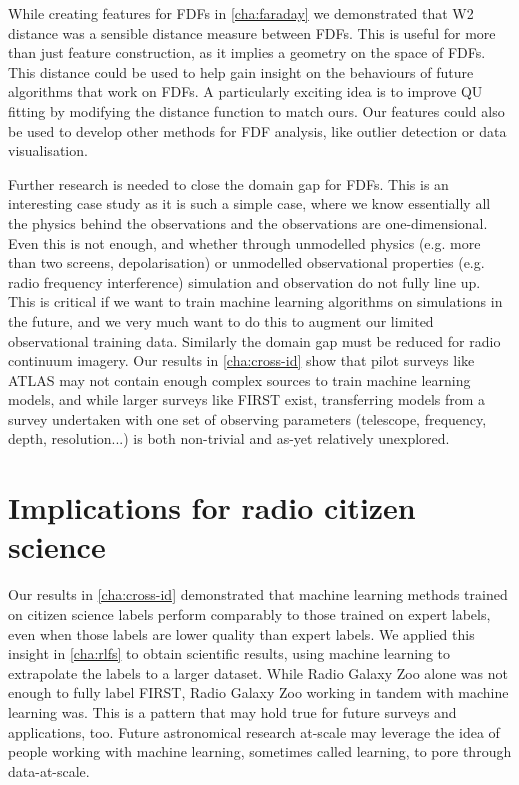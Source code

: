      While creating features for FDFs in \autoref{cha:faraday} we demonstrated that W2 distance was a sensible distance measure between FDFs. This is useful for more than just feature construction, as it implies a geometry on the space of FDFs. This distance could be used to help gain insight on the behaviours of future algorithms that work on FDFs. A particularly exciting idea is to improve QU fitting by modifying the distance function to match ours. Our features could also be used to develop other methods for FDF analysis, like outlier detection or data visualisation.

     Further research is needed to close the domain gap for FDFs. This is an interesting case study as it is such a simple case, where we know essentially all the physics behind the observations and the observations are one-dimensional. Even this is not enough, and whether through unmodelled physics (e.g. more than two screens, depolarisation) or unmodelled observational properties (e.g. radio frequency interference) simulation and observation do not fully line up. This is critical if we want to train machine learning algorithms on simulations in the future, and we very much want to do this to augment our limited observational training data. Similarly the domain gap must be reduced for radio continuum imagery. Our results in \autoref{cha:cross-id} show that pilot surveys like ATLAS may not contain enough complex sources to train machine learning models, and while larger surveys like FIRST exist, transferring models from a survey undertaken with one set of observing parameters (telescope, frequency, depth, resolution...) is both non-trivial and as-yet relatively unexplored.

\section{Implications for radio citizen science}
\label{sec:implications-citizen-science}

    Our results in \autoref{cha:cross-id} demonstrated that machine learning methods trained on citizen science labels perform comparably to those trained on expert labels, even when those labels are lower quality than expert labels. We applied this insight in \autoref{cha:rlfs} to obtain scientific results, using machine learning to extrapolate the labels to a larger dataset. While Radio Galaxy Zoo alone was not enough to fully label FIRST, Radio Galaxy Zoo working in tandem with machine learning was. This is a pattern that may hold true for future surveys and applications, too. Future astronomical research at-scale may leverage the idea of people working with machine learning, sometimes called  \citep[e.g.][]{holzinger_interactive_2016} learning, to pore through data-at-scale.


